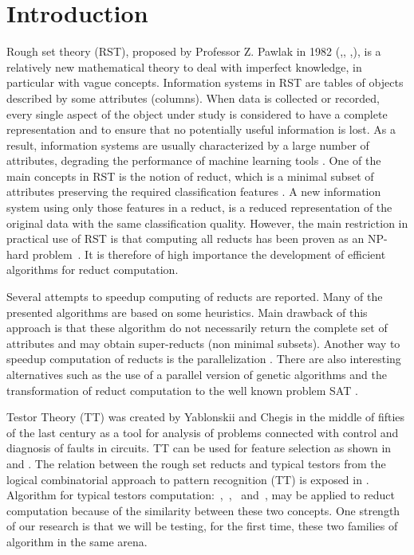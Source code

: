 \documentclass[11pt]{article}   %
\begin{document}
\section{Introduction}
  Rough set theory (RST), proposed by Professor Z. Pawlak in 1982 (\cite{Pawlak81},\cite{Pawlak81-2},
  \cite{Pawlak82},\cite{Pawlak91}), is a relatively new mathematical theory 
  to deal with imperfect knowledge, in particular with vague concepts. Information systems in RST 
  are tables of objects described by some attributes (columns). 
  When data is collected or recorded, every single aspect of the object under study is considered 
  to have a complete representation and to ensure that no potentially useful information is lost.
  As a result, information systems are usually characterized by a large number of attributes,
  degrading the performance of machine learning tools \cite{Parthalain08}.
  One of the main concepts in RST is the notion of reduct, which is a minimal subset of attributes 
  preserving the required classification features \cite{Pawlak91}. A new information system using 
  only those features in a reduct, is a reduced representation of the original data with the same 
  classification quality. 
  However, the main restriction in practical use of RST is that computing all reducts has been proven 
  as an NP-hard problem~\cite{Skowron92}.
  It is therefore of high importance the development of efficient algorithms for reduct computation.
  
  Several attempts to speedup computing of reducts are reported. Many of the presented algorithms are 
  based on some heuristics. Main drawback of this approach is that these algorithm do not necessarily 
  return the complete set of attributes and may obtain super-reducts (non minimal subsets). Another 
  way to speedup computation of reducts is the parallelization \cite{Strakowski08}. There are also 
  interesting alternatives such as the use of a parallel version of genetic algorithms \cite{Wroblewski98}
  and the transformation of reduct computation to the well known problem SAT \cite{Jensen14}.
  
  Testor Theory (TT) was created by Yablonskii and Chegis in the middle of fifties 
  of the last century as a tool for analysis of problems connected with control and 
  diagnosis of faults in circuits. TT can be used for feature selection as shown in~\cite{Ruiz08}
  and \cite{Martinez01}. The relation between the rough set reducts and typical testors from the
  logical combinatorial approach to pattern recognition (TT) is exposed in \cite{Lazo15}. Algorithm for
  typical testors computation:~\cite{Ruiz85},~\cite{Santiesteban03},~\cite{Sanchez07} and~\cite{Lias09},
  may be applied to reduct computation because of the similarity between these two concepts. One strength 
  of our research is that we will be testing, for the first time, these two families of algorithm in the 
  same arena.
  
\end{document}
